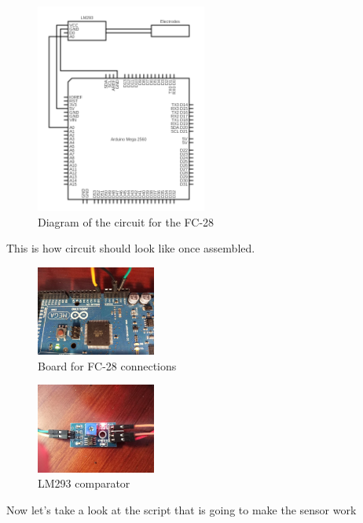 \begin{figure}[H]
    \centering
    \includegraphics[width=0.5\textwidth]{fig/fc28-scheme-circuit.png}
    \caption{Diagram of the circuit for the FC-28}
    \label{fig:fc28-scheme-circuit}
\end{figure}


This is how circuit should look like once assembled.
	\begin{figure}[H]
		\centering
		\includegraphics[width=0.35\textwidth]{fig/fc28-circuit1.jpg}
		\caption{Board for FC-28 connections}
	\end{figure}
	\hfill
	\begin{figure}[H]
		\centering
		\includegraphics[width=0.35\textwidth]{fig/fc28-circuit2.jpg}
		\caption{LM293 comparator}
	\end{figure}

Now let's take a look at the script that is going to make the sensor work



